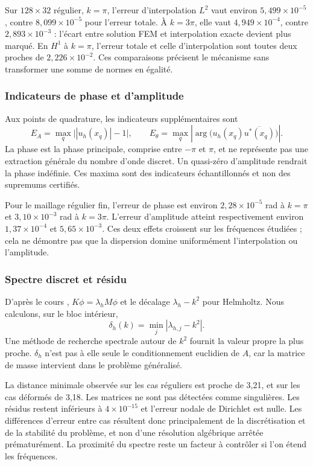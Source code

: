 \documentclass[12pt,a4paper]{article}
\begin{document}
Sur $128\times32$ régulier, $k=\pi$, l'erreur d'interpolation $L^2$ vaut environ $5,499\times10^{-5}$, contre $8,099\times10^{-5}$ pour l'erreur totale. À $k=3\pi$, elle vaut $4,949\times10^{-4}$, contre $2,893\times10^{-3}$ : l'écart entre solution FEM et interpolation exacte devient plus marqué. En $H^1$ à $k=\pi$, l'erreur totale et celle d'interpolation sont toutes deux proches de $2,226\times10^{-2}$. Ces comparaisons précisent le mécanisme sans transformer une somme de normes en égalité.

\subsubsection{Indicateurs de phase et d'amplitude}
Aux points de quadrature, les indicateurs supplémentaires sont
\begin{equation*}
E_A=\max_q\bigl||u_h(x_q)|-1\bigr|,\qquad
E_\theta=\max_q\left|\arg\bigl(u_h(x_q)\overline{u^*(x_q)}\bigr)\right|.
\end{equation*}
La phase est la phase principale, comprise entre $-\pi$ et $\pi$, et ne représente pas une extraction générale du nombre d'onde discret. Un quasi-zéro d'amplitude rendrait la phase indéfinie. Ces maxima sont des indicateurs échantillonnés et non des supremums certifiés.

Pour le maillage régulier fin, l'erreur de phase est environ $2,28\times10^{-5}$ rad à $k=\pi$ et $3,10\times10^{-3}$ rad à $k=3\pi$. L'erreur d'amplitude atteint respectivement environ $1,37\times10^{-4}$ et $5,65\times10^{-3}$. Ces deux effets croissent sur les fréquences étudiées ; cela ne démontre pas que la dispersion domine uniformément l'interpolation ou l'amplitude.

\subsubsection{Spectre discret et résidu}
D’après le cours \cite{eigen}, $K\phi=\lambda_hM\phi$ et le décalage $\lambda_h-k^2$ pour Helmholtz. Nous calculons, sur le bloc intérieur,
\begin{equation*}
\delta_h(k)=\min_j|\lambda_{h,j}-k^2|.
\end{equation*}
Une méthode de recherche spectrale autour de $k^2$ fournit la valeur propre la plus proche. $\delta_h$ n'est pas à elle seule le conditionnement euclidien de $A$, car la matrice de masse intervient dans le problème généralisé.

La distance minimale observée sur les cas réguliers est proche de 3,21, et sur les cas déformés de 3,18. Les matrices ne sont pas détectées comme singulières. Les résidus restent inférieurs à $4\times10^{-15}$ et l'erreur nodale de Dirichlet est nulle. Les différences d'erreur entre cas résultent donc principalement de la discrétisation et de la stabilité du problème, et non d'une résolution algébrique arrêtée prématurément. La proximité du spectre reste un facteur à contrôler si l'on étend les fréquences.
\end{document}
